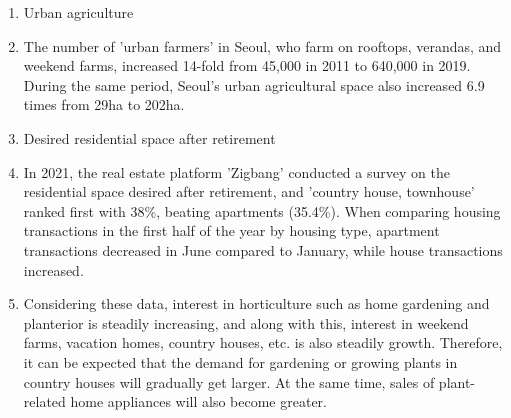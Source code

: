 \documentclass[conference, a4paper]{IEEEtran}
\begin{document}
\begin{enumerate}
\item Urban agriculture
\item[] The number of 'urban farmers' in Seoul, who farm on rooftops, verandas, and weekend farms, increased 14-fold from 45,000 in 2011 to 640,000 in 2019. During the same period, Seoul's urban agricultural space also increased 6.9 times from 29ha to 202ha. \cite{hani_article} \\

\item Desired residential space after retirement
\item[] In 2021, the real estate platform 'Zigbang' conducted a survey on the residential space desired after retirement, and 'country house, townhouse' ranked first with 38\%, beating apartments (35.4\%). When comparing housing transactions in the first half of the year by housing type, apartment transactions decreased in June compared to January, while house transactions increased.  \cite{donga_article}\\

\item[]Considering these data, interest in horticulture such as home gardening and planterior is steadily increasing, and along with this, interest in weekend farms, vacation homes, country houses, etc. is also steadily growth. Therefore, it can be expected that the demand for gardening or growing plants in country houses will gradually get larger. At the same time, sales of plant-related home appliances will also become greater. \\
\end{enumerate}


\end{document}
